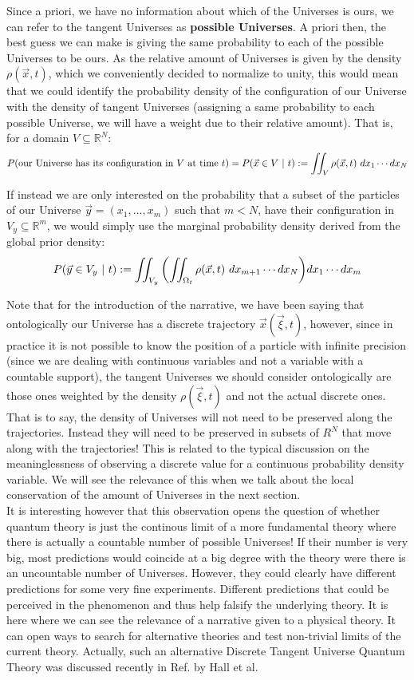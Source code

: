 \documentclass[11pt, a4paper]{article} %
\newcommand{\R}{\mathbb{R}} %
\DeclareRobustCommand{\mybox}[2][gray!10]{%
\begin{tcolorbox}[   %
        left=0.2cm,
        right=0.2cm,
        top=0.15cm,
        bottom=0.15cm,
        colback=#1,
        colframe=#1,
        width=\dimexpr\textwidth\relax, 
        enlarge left by=0mm,
        boxsep=5pt,
        arc=0pt,outer arc=0pt,
        ]
        #2
\end{tcolorbox}
}
\begin{document}
Since a priori, we have no information about which of the Universes is ours, we can refer to the tangent Universes as {\bf possible Universes}. A priori then, the best guess we can make is giving the same probability to each of the possible Universes to be ours. As the relative amount of Universes is given by the density $\rho(\vec{x},t)$, which we conveniently decided to normalize to unity, this would mean that we could identify the probability density of the configuration of our Universe with the density of tangent Universes (assigning a same probability to each possible Universe, we will have a weight due to their relative amount). That is, for a domain $V\subseteq \R^N$:
\begin{equation}
P\qty(\text{our Universe has its configuration in }V\text{ at time }t)=P(\vec{x}\in V\ |\ t) := \iint_{V}\rho(\vec{x},t)\ dx_1\cdots dx_N
\end{equation}

If instead we are only interested on the probability that a subset of the particles of our Universe $\vec{y}=(x_1,...,x_m)$ such that $m<N$, have their configuration in $V_y\subseteq \R^m$, we would simply use the marginal probability density derived from the global prior density:
$$
P(\vec{y}\in V_y\ |\ t) := \iint_{V_y}\qty(\iint_{\Omega_t}\rho(\vec{x},t)\ dx_{m+1}\cdots dx_N)dx_1\cdots dx_m
$$
\mybox{
Note that for the introduction of the narrative, we have been saying that ontologically our Universe has a discrete trajectory $\vec{x}(\vec{\xi},t)$, however, since in practice it is not possible to know the position of a particle with infinite precision (since we are dealing with continuous variables and not a variable with a countable support), the tangent Universes we should consider ontologically are those ones weighted by the density $\rho(\vec{\xi},t)$ and not the actual discrete ones. That is to say, the density of Universes will not need to be preserved along the trajectories. Instead they will need to be preserved in subsets of $R^N$ that move along with the trajectories! This is related to the typical discussion on the meaninglessness of observing a discrete value for a continuous probability density variable. We will see the relevance of this when we talk about the local conservation of the amount of Universes in the next section.\\

It is interesting however that this observation opens the question of whether quantum theory is just the continous limit of a more fundamental theory where there is actually a countable number of possible Universes! If their number is very big, most predictions would coincide at a big degree with the theory were there is an uncountable number of Universes. However, they could clearly have different predictions for some very fine experiments. Different predictions that could be perceived in the phenomenon and thus help falsify the underlying theory. It is here where we can see the relevance of a narrative given to a physical theory. It can open ways to search for alternative theories and test non-trivial limits of the current theory. Actually, such an alternative Discrete Tangent Universe Quantum Theory was discussed recently in Ref. \citeA{hall:many} by Hall et al.
}
\end{document}
